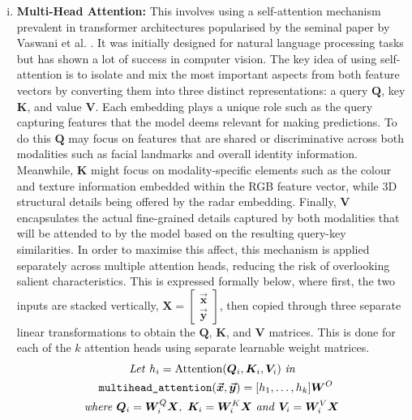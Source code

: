 \documentclass{mpaper}
\newcommand{\verbtt}[1]{
  \text{\normalfont\ttfamily\detokenize{#1}}
}
\begin{document}
\begin{enumerate}[i.]
    \item \textbf{Multi-Head Attention:} This involves using a self-attention mechanism prevalent in transformer architectures popularised by the seminal paper by Vaswani et al. \cite{vaswani2017attention}. It was initially designed for natural language processing tasks but has shown a lot of success in computer vision. The key idea of using self-attention is to isolate and mix the most important aspects from both feature vectors by converting them into three distinct representations: a query $\bm{Q}$, key $\bm{K}$, and value $\bm{V}$. Each embedding plays a unique role such as the query capturing features that the model deems relevant for making predictions. To do this $\bm{Q}$ may focus on features that are shared or discriminative across both modalities such as facial landmarks and overall identity information. Meanwhile, $\bm{K}$ might focus on modality-specific elements such as the colour and texture information embedded within the RGB feature vector, while 3D structural details being offered by the radar embedding. Finally, $\bm{V}$ encapsulates the actual fine-grained details captured by both modalities that will be attended to by the model based on the resulting query-key similarities. In order to maximise this affect, this mechanism is applied separately across multiple attention heads, reducing the risk of overlooking salient characteristics.
    This is expressed formally below, where first, the two inputs are stacked vertically, $\bm{X} = \begin{bmatrix} \bm{\vec{x}} \\ \bm{\vec{y}} \end{bmatrix}$, then copied through three separate linear transformations to obtain the $\bm{Q}$, $\bm{K}$, and $\bm{V}$ matrices. This is done for each of the $k$ attention heads using separate learnable weight matrices.
    \begin{align*}
        \mathit{Let} \ h_i = \text{Attention}(\bm{Q}_i&, \bm{K}_i, \bm{V}_i) \ \mathit{in} \\
        \hspace{-1cm}\verbtt{multihead_attention}(\bm{\vec{x}}, \bm{\vec{y}}) &= [h_1, \ldots, h_k]\bm{W}^O \\
        \mathit{where} \ 
        \bm{Q}_i = \bm{W}^{Q}_i\bm{X}, \ \bm{K}_i = \bm{W}^{K}_i&\bm{X} \ \mathit{and} \ \bm{V}_i = \bm{W}^{V}_i\bm{X}
    \end{align*}
\end{enumerate}
\end{document}
